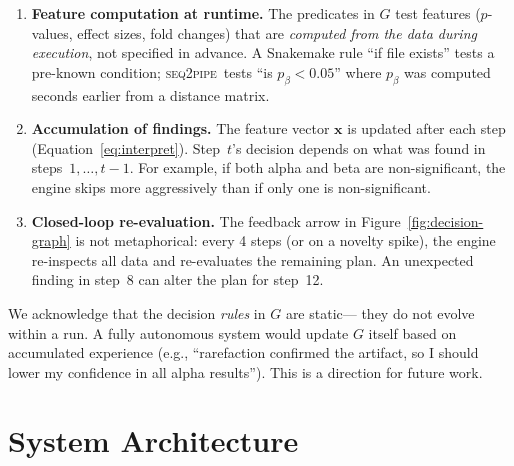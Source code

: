 \documentclass[11pt,a4paper]{article}
\newcommand{\seqpipe}{\textsc{seq2pipe}}
\begin{document}
\begin{enumerate}
  \item \textbf{Feature computation at runtime.}
    The predicates in $G$ test features ($p$-values, effect sizes,
    fold changes) that are \emph{computed from the data during
    execution}, not specified in advance.
    A Snakemake rule ``if file exists'' tests a pre-known condition;
    \seqpipe\ tests ``is $p_\beta < 0.05$'' where $p_\beta$ was
    computed seconds earlier from a distance matrix.

  \item \textbf{Accumulation of findings.}
    The feature vector $\mathbf{x}$ is updated after each step
    (Equation~\ref{eq:interpret}).
    Step~$t$'s decision depends on what was found in
    steps~$1, \ldots, t{-}1$.
    For example, if both alpha and beta are non-significant, the
    engine skips more aggressively than if only one is
    non-significant.

  \item \textbf{Closed-loop re-evaluation.}
    The feedback arrow in Figure~\ref{fig:decision-graph} is not
    metaphorical: every 4 steps (or on a novelty spike), the engine
    re-inspects all data and re-evaluates the remaining plan.
    An unexpected finding in step~8 can alter the plan for step~12.
\end{enumerate}

We acknowledge that the decision \emph{rules} in $G$ are static---
they do not evolve within a run.
A fully autonomous system would update $G$ itself based on
accumulated experience (e.g., ``rarefaction confirmed the artifact,
so I should lower my confidence in all alpha results'').
This is a direction for future work.

\section{System Architecture}
\label{sec:arch}
\end{document}
